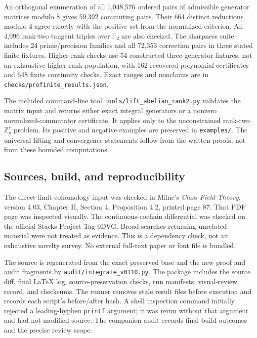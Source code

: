 An orthogonal enumeration of all 1,048,576 ordered pairs of admissible generator matrices modulo $8$ gives 59,392 commuting pairs. Their 664 distinct reductions modulo $4$ agree exactly with the positive set from the normalized criterion. All 4,096 rank-two tangent triples over $\mathbb F_2$ are also checked. The sharpness suite includes 24 prime/precision families and all 72,353 correction pairs in three stated finite fixtures. Higher-rank checks use 54 constructed three-generator fixtures, not an exhaustive higher-rank population, with 162 recovered polynomial certificates and 648 finite continuity checks. Exact ranges and nonclaims are in \texttt{checks/profinite\_results.json}.

The included command-line tool \texttt{tools/lift\_abelian\_rank2.py} validates the matrix input and returns either exact integral generators or a nonzero normalized-commutator certificate. It applies only to the unconstrained rank-two $\mathbb Z_p^r$ problem. Its positive and negative examples are preserved in \texttt{examples/}. The universal lifting and convergence statements follow from the written proofs, not from these bounded computations.

\subsection{Sources, build, and reproducibility}
The direct-limit cohomology input was checked in Milne's \emph{Class Field Theory}, version 4.03, Chapter II, Section 4, Proposition 4.2, printed page 87. That PDF page was inspected visually. The continuous-cochain differential was checked on the official Stacks Project Tag 0DVG. Broad searches returning unrelated material were not treated as evidence. This is a dependency check, not an exhaustive novelty survey. No external full-text paper or font file is bundled.

The source is regenerated from the exact preserved base and the new proof and audit fragments by \texttt{audit/integrate\_v0110.py}. The package includes the source diff, final LaTeX log, source-preservation checks, run manifests, visual-review record, and checksums. The runner removes stale result files before execution and records each script's before/after hash. A shell inspection command initially rejected a leading-hyphen \texttt{printf} argument; it was rerun without that argument and had not modified source. The companion audit records final build outcomes and the precise review scope.
